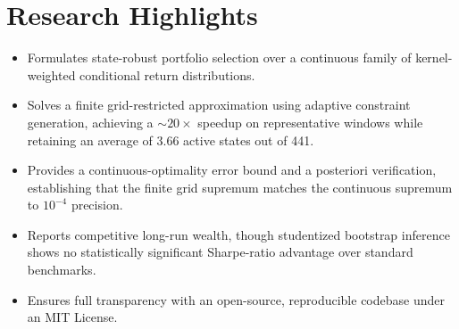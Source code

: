 \documentclass[12pt]{article}
\begin{document}
\section*{Research Highlights}

\begin{itemize}[leftmargin=*]
    \item Formulates state-robust portfolio selection over a continuous family of kernel-weighted conditional return distributions.
    \item Solves a finite grid-restricted approximation using adaptive constraint generation, achieving a $\sim 20\times$ speedup on representative windows while retaining an average of 3.66 active states out of 441.
    \item Provides a continuous-optimality error bound and a posteriori verification, establishing that the finite grid supremum matches the continuous supremum to $10^{-4}$ precision.
    \item Reports competitive long-run wealth, though studentized bootstrap inference shows no statistically significant Sharpe-ratio advantage over standard benchmarks.
    \item Ensures full transparency with an open-source, reproducible codebase under an MIT License.
\end{itemize}
\end{document}
